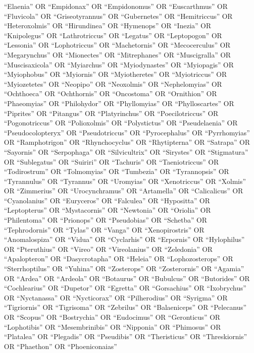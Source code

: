 \documentclass[
  number,
  review,
  onecolumn]{elsarticle}
\begin{document}
``Elaenia'' OR ``Empidonax'' OR ``Empidonomus'' OR ``Euscarthmus'' OR
``Fluvicola'' OR ``Griseotyrannus'' OR ``Gubernetes'' OR ``Hemitriccus''
OR ``Heteroxolmis'' OR ``Hirundinea'' OR ``Hymenops'' OR ``Inezia'' OR
``Knipolegus'' OR ``Lathrotriccus'' OR ``Legatus'' OR ``Leptopogon'' OR
``Lessonia'' OR ``Lophotriccus'' OR ``Machetornis'' OR ``Mecocerculus''
OR ``Megarynchus'' OR ``Mionectes'' OR ``Mitrephanes'' OR
``Muscigralla'' OR ``Muscisaxicola'' OR ``Myiarchus'' OR
``Myiodynastes'' OR ``Myiopagis'' OR ``Myiophobus'' OR ``Myiornis'' OR
``Myiotheretes'' OR ``Myiotriccus'' OR ``Myiozetetes'' OR ``Neopipo'' OR
``Neoxolmis'' OR ``Nephelomyias'' OR ``Ochthoeca'' OR ``Ochthornis'' OR
``Oncostoma'' OR ``Ornithion'' OR ``Phaeomyias'' OR ``Philohydor'' OR
``Phyllomyias'' OR ``Phylloscartes'' OR ``Piprites'' OR ``Pitangus'' OR
``Platyrinchus'' OR ``Poecilotriccus'' OR ``Pogonotriccus'' OR
``Polioxolmis'' OR ``Polystictus'' OR ``Pseudelaenia'' OR
``Pseudocolopteryx'' OR ``Pseudotriccus'' OR ``Pyrocephalus'' OR
``Pyrrhomyias'' OR ``Ramphotrigon'' OR ``Rhynchocyclus'' OR
``Rhytipterna'' OR ``Satrapa'' OR ``Sayornis'' OR ``Serpophaga'' OR
``Silvicultrix'' OR ``Sirystes'' OR ``Stigmatura'' OR ``Sublegatus'' OR
``Suiriri'' OR ``Tachuris'' OR ``Taeniotriccus'' OR ``Todirostrum'' OR
``Tolmomyias'' OR ``Tumbezia'' OR ``Tyrannopsis'' OR ``Tyrannulus'' OR
``Tyrannus'' OR ``Uromyias'' OR ``Xenotriccus'' OR ``Xolmis'' OR
``Zimmerius'' OR ``Urocynchramus'' OR ``Artamella'' OR ``Calicalicus''
OR ``Cyanolanius'' OR ``Euryceros'' OR ``Falculea'' OR ``Hypositta'' OR
``Leptopterus'' OR ``Mystacornis'' OR ``Newtonia'' OR ``Oriolia'' OR
``Philentoma'' OR ``Prionops'' OR ``Pseudobias'' OR ``Schetba'' OR
``Tephrodornis'' OR ``Tylas'' OR ``Vanga'' OR ``Xenopirostris'' OR
``Anomalospiza'' OR ``Vidua'' OR ``Cyclarhis'' OR ``Erpornis'' OR
``Hylophilus'' OR ``Pteruthius'' OR ``Vireo'' OR ``Vireolanius'' OR
``Zeledonia'' OR ``Apalopteron'' OR ``Dasycrotapha'' OR ``Heleia'' OR
``Lophozosterops'' OR ``Sterrhoptilus'' OR ``Yuhina'' OR ``Zosterops''
OR ``Zosterornis'' OR ``Agamia'' OR ``Ardea'' OR ``Ardeola'' OR
``Botaurus'' OR ``Bubulcus'' OR ``Butorides'' OR ``Cochlearius'' OR
``Dupetor'' OR ``Egretta'' OR ``Gorsachius'' OR ``Ixobrychus'' OR
``Nyctanassa'' OR ``Nycticorax'' OR ``Pilherodius'' OR ``Syrigma'' OR
``Tigriornis'' OR ``Tigrisoma'' OR ``Zebrilus'' OR ``Balaeniceps'' OR
``Pelecanus'' OR ``Scopus'' OR ``Bostrychia'' OR ``Eudocimus'' OR
``Geronticus'' OR ``Lophotibis'' OR ``Mesembrinibis'' OR ``Nipponia'' OR
``Phimosus'' OR ``Platalea'' OR ``Plegadis'' OR ``Pseudibis'' OR
``Theristicus'' OR ``Threskiornis'' OR ``Phaethon'' OR ``Phoeniconaias''
\end{document}
